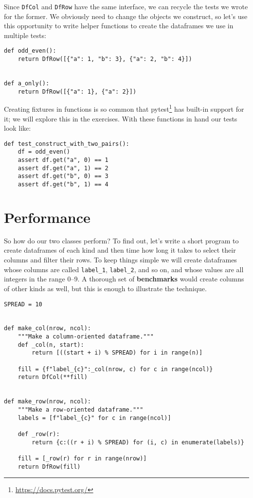 \documentclass{scrbook}
\newcommand{\glossref}[1]{\textbf{#1}}
\newcommand{\hreffoot}[2]{{#1}\footnote{\href{#2}{#2}}}
\begin{document}
Since \texttt{DfCol} and \texttt{DfRow} have the same interface,
we can recycle the tests we wrote for the former.
We obviously need to change the objects we construct,
so let's use this opportunity to write helper functions
to create the dataframes we use in multiple tests:


\begin{lstlisting}[frame=single,frameround=tttt]
def odd_even():
    return DfRow([{"a": 1, "b": 3}, {"a": 2, "b": 4}])


def a_only():
    return DfRow([{"a": 1}, {"a": 2}])
\end{lstlisting}



Creating fixtures in functions is so common
that \hreffoot{pytest}{https://docs.pytest.org/} has built-in support for it;
we will explore this in the exercises.
With these functions in hand our tests look like:


\begin{lstlisting}[frame=single,frameround=tttt]
def test_construct_with_two_pairs():
    df = odd_even()
    assert df.get("a", 0) == 1
    assert df.get("a", 1) == 2
    assert df.get("b", 0) == 3
    assert df.get("b", 1) == 4
\end{lstlisting}


\section{Performance}\label{dataframe-performance}


So how do our two classes perform?
To find out,
let's write a short program to create dataframes of each kind
and then time how long it takes to select their columns and filter their rows.
To keep things simple
we will create dataframes whose columns are called \texttt{label\_1}, \texttt{label\_2}, and so on,
and whose values are all integers in the range 0–9.
A thorough set of \glossref{benchmarks} would create columns of other kinds as well,
but this is enough to illustrate the technique.


\begin{lstlisting}[frame=single,frameround=tttt]
SPREAD = 10


def make_col(nrow, ncol):
    """Make a column-oriented dataframe."""
    def _col(n, start):
        return [((start + i) % SPREAD) for i in range(n)]

    fill = {f"label_{c}":_col(nrow, c) for c in range(ncol)}
    return DfCol(**fill)


def make_row(nrow, ncol):
    """Make a row-oriented dataframe."""
    labels = [f"label_{c}" for c in range(ncol)]

    def _row(r):
        return {c:((r + i) % SPREAD) for (i, c) in enumerate(labels)}

    fill = [_row(r) for r in range(nrow)]
    return DfRow(fill)
\end{lstlisting}
\end{document}

